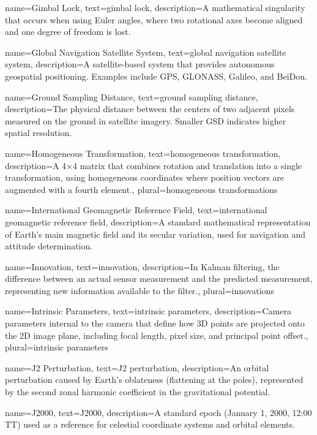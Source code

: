 {
	name=Gimbal Lock,
	text=gimbal lock,
	description={A mathematical singularity that occurs when using Euler angles, where two rotational axes become aligned and one degree of freedom is lost.}
}

{
	name=Global Navigation Satellite System,
	text=global navigation satellite system,
	description={A satellite-based system that provides autonomous geospatial positioning. Examples include GPS, GLONASS, Galileo, and BeiDou.}
}

{
	name=Ground Sampling Distance,
	text=ground sampling distance,
	description={The physical distance between the centers of two adjacent pixels measured on the ground in satellite imagery. Smaller GSD indicates higher spatial resolution.}
}

{
	name=Homogeneous Transformation,
	text=homogeneous transformation,
	description={A 4×4 matrix that combines rotation and translation into a single transformation, using homogeneous coordinates where position vectors are augmented with a fourth element.},
	plural=homogeneous transformations
}

{
	name=International Geomagnetic Reference Field,
	text=international geomagnetic reference field,
	description={A standard mathematical representation of Earth's main magnetic field and its secular variation, used for navigation and attitude determination.}
}

{
	name=Innovation,
	text=innovation,
	description={In Kalman filtering, the difference between an actual sensor measurement and the predicted measurement, representing new information available to the filter.},
	plural=innovations
}

{
	name=Intrinsic Parameters,
	text=intrinsic parameters,
	description={Camera parameters internal to the camera that define how 3D points are projected onto the 2D image plane, including focal length, pixel size, and principal point offset.},
	plural=intrinsic parameters
}

{
	name=J2 Perturbation,
	text=J2 perturbation,
	description={An orbital perturbation caused by Earth's oblateness (flattening at the poles), represented by the second zonal harmonic coefficient in the gravitational potential.}
}

{
	name=J2000,
	text=J2000,
	description={A standard epoch (January 1, 2000, 12:00 TT) used as a reference for celestial coordinate systems and orbital elements.}
}

